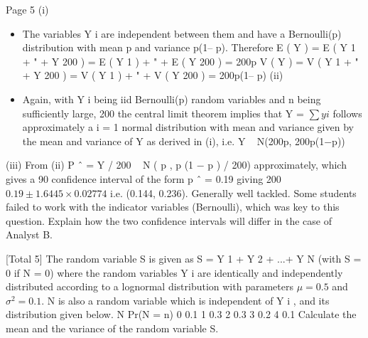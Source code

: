 \documentclass[a4paper,12pt]{article}
\begin{document}
Page 5%
\newpage
(i)
\begin{itemize}
    \item The variables Y i are independent between them and have a Bernoulli(p)
distribution with mean p and variance p(1– p).
Therefore E ( Y ) = E ( Y 1 + " + Y 200 ) = E ( Y 1 ) + " + E ( Y 200 ) = 200p
V ( Y ) = V ( Y 1 + " + Y 200 ) = V ( Y 1 ) + " + V ( Y 200 ) = 200p(1– p)
(ii)
\item Again, with Y i being iid Bernoulli(p) random variables and n being sufficiently
large,
200
the central limit theorem implies that Y = $\sum y i$ follows approximately a
i = 1
normal distribution with mean and variance given by the mean and variance of
Y as derived in (i), i.e.
Y ~ N(200p, 200p(1−p))
\end{itemize}

(iii)
From (ii) P ˆ = Y / 200 ~ N ( p , p (1 − p ) / 200) approximately, which gives a 90%
confidence interval of the form
p ˆ = 0.19 giving
200
$0.19 \pm 1.6445 \times 0.02774$
i.e. (0.144, 0.236).
Generally well tackled. Some students failed to work with the indicator variables (Bernoulli),
which was key to this question.
\newpage
Explain how the two confidence intervals will differ in the case of Analyst B.

[Total 5]
The random variable S is given as S = Y 1 + Y 2 + ...+ Y N (with S = 0 if N = 0) where
the random variables Y i are identically and independently distributed according to a
lognormal distribution with parameters $\mu = 0.5$ and $\sigma^2 = 0.1.$ N is also a random
variable which is independent of Y i , and its distribution given below.
N
Pr(N = n)
0
0.1
1
0.3
2
0.3
3
0.2
4
0.1
Calculate the mean and the variance of the random variable S.
\newpage
\end{document}
